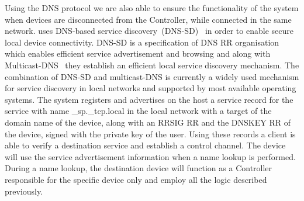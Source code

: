 Using the DNS protocol we are also able to ensure the functionality of the
system when devices are disconnected from the \signpost Controller, while
connected in the same network. \signpost uses DNS-based service
discovery~(DNS-SD)~\cite{RFC6763} in order to enable secure local device
connectivity.  DNS-SD is a specification of DNS RR organisation which enables
efficient service advertisement and browsing and along with
Multicast-DNS~\cite{RFC6762} they establish an efficient local service discovery
mechanism. The combination of DNS-SD and multicast-DNS is currently a widely
used mechanism for service discovery in local networks and supported by most
available operating systems.  The \signpost system registers and advertises on
the host a service record for the \signpost service with name \_sp.\_tcp.local
in the local network with a target of the domain name of the device, along with
an RRSIG RR and the DNSKEY RR of the device, signed with the private key of the
user. Using these records a \signpost client is able to verify a destination
\signpost service and establish a control channel. 
The device will use the service advertisement information when a name lookup is
performed. During a name lookup,  the destination device will function as a
\signpost Controller responsible for the specific device only and employ all the
logic described previously.

